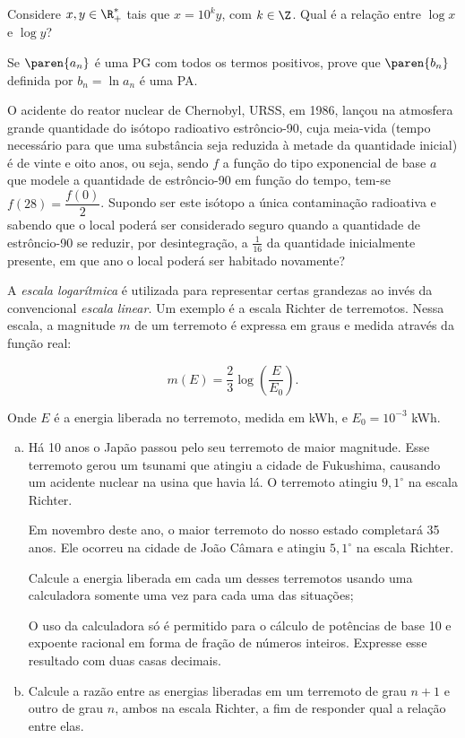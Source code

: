 \begin{exercise}
    Considere $x, y \in \R^\ast_+$ tais que $x = 10^k y$, com $k\in \Z$.
Qual é a relação entre $\log x $ e $\log y$?
\end{exercise}

\begin{exercise}
    Se $\paren{a_n}$ é uma PG com todos os termos positivos, prove
que $\paren{ b_n}$ definida por $b_n = \ln{a_n}$ é uma PA.
\end{exercise}

\begin{exercise}
    O acidente do reator nuclear de Chernobyl, URSS, em 1986, lançou
na atmosfera grande quantidade do isótopo radioativo estrôncio-90,
cuja meia-vida (tempo necessário para que uma substância seja
reduzida à metade da quantidade inicial) é de vinte e oito anos, ou
seja, sendo $f$  a função do tipo exponencial de base $a$ que modele a
quantidade de estrôncio-90 em função do tempo, tem-se $f(28) = \dfrac
{f(0)} 2$. Supondo ser este isótopo a única contaminação
radioativa e sabendo que o local poderá ser considerado seguro
quando a quantidade de estrôncio-90 se reduzir, por desintegração, a
$\frac 1 {16}$ da quantidade inicialmente presente, em que ano o
local poderá ser habitado novamente?
\end{exercise}

\begin{exercise}
    A \emph{escala logarítmica} é utilizada para representar certas grandezas ao invés da convencional \emph{escala linear}. Um exemplo é a escala Richter de terremotos. Nessa escala, a magnitude $m$ de um terremoto é expressa em graus e medida através da função real:

    $$m (E) = \dfrac{2}{3} \log \left( \dfrac E {E_0} \right).$$

    Onde $E$ é a energia liberada no terremoto, medida em kWh, e $E_0 = 10^{-3}$ kWh.
    \begin{enumerate}[a)]
        \item Há 10 anos o Japão passou pelo seu terremoto de maior magnitude. Esse terremoto  gerou um tsunami que atingiu a cidade de Fukushima, causando um acidente nuclear na usina que havia lá. O terremoto atingiu $9{,}1^\circ $ na escala Richter.

        Em novembro deste ano, o maior terremoto do nosso estado completará 35 anos. Ele ocorreu na cidade de João Câmara e atingiu $5{,}1^\circ$ na escala Richter.

        Calcule a energia liberada em cada um desses terremotos usando uma calculadora somente uma vez para cada uma das situações;
        \begin{remark}
             O uso da calculadora só é permitido para o cálculo de potências de base 10 e expoente racional em forma de fração de números inteiros. Expresse esse resultado com duas casas decimais.
        \end{remark}
        \item Calcule a razão entre as energias liberadas em um terremoto de grau $n+1$ e outro de grau $n$, ambos na escala Richter, a fim de responder qual a relação entre elas.
    \end{enumerate}
\end{exercise}
